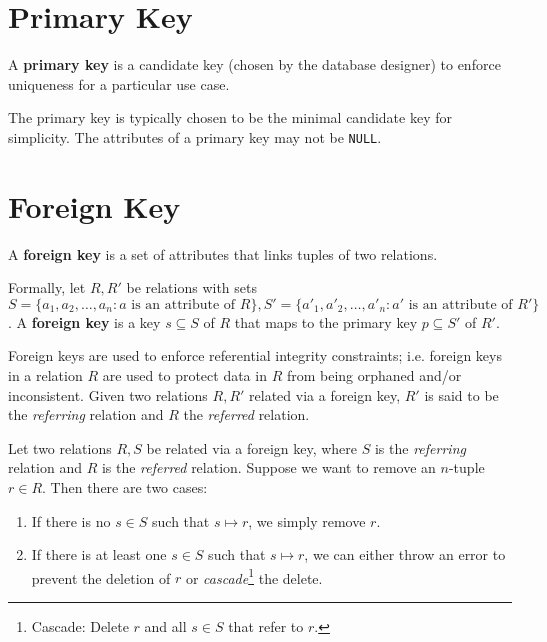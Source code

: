 \documentclass{report}
\newenvironment{definition}[1]{\begin{tcolorbox}[title={Definition: #1}]}{\end{tcolorbox}}
\renewcommand{\bf}[1]{\textbf{{#1}}}
\renewcommand{\tt}[1]{\texttt{{#1}}}
\renewcommand{\it}[1]{\textit{{#1}}}
\begin{document}
\section{Primary Key}
\begin{definition}{Primary Key and Composite Key}
    A \bf{primary key} is a candidate key (chosen by the database designer) to enforce uniqueness
    for a particular use case.
\end{definition}
The primary key is typically chosen to be the minimal candidate key for simplicity. The attributes
of a primary key may not be \tt{NULL}. 

\section{Foreign Key}
\begin{definition}{Foreign Key}
    A \bf{foreign key} is a set of attributes that links tuples of two relations.\vspace{10pt}

    Formally, let $R, R'$ be relations with sets $S = \{a_1, a_2, \ldots, a_n : a 
        \text{ is an attribute of } R\}, S' = \{a'_1, a'_2, \ldots, a'_n : a' \text{ is an attribute of }
    R'\}$. A \bf{foreign key} is a key $s \subseteq S$ of $R$ that maps to the primary key 
    $p \subseteq S'$ of $R'$.
\end{definition}
Foreign keys are used to enforce referential integrity constraints; i.e. foreign keys in a 
relation $R$ are used to protect data in $R$ from being orphaned and/or inconsistent. Given two
relations $R, R'$ related via a foreign key, $R'$ is said to be the \it{referring} relation and 
$R$ the \it{referred} relation.

Let two relations $R, S$ be related via a foreign key, where $S$ is the \it{referring} relation
and $R$ is the \it{referred} relation. Suppose we want to remove an $n$-tuple $r \in R$. Then there
are two cases:
\begin{enumerate}[label=\textit{Case \arabic*}]
    \item If there is no $s \in S$ such that $s \mapsto r$, we simply remove $r$.
    \item If there is at least one $s \in S$ such that $s \mapsto r$, we can either throw an error
        to prevent the deletion of $r$ or \it{cascade}\footnote{Cascade: Delete $r$ and all 
        $s \in S$ that refer to $r$.} the delete.
\end{enumerate}
\end{document}
